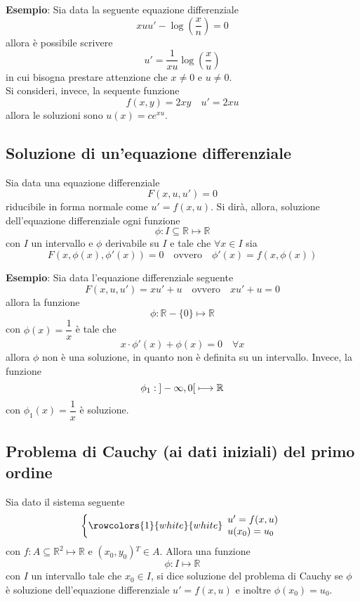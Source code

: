 \documentclass[a4paper]{extarticle}
\begin{document}
\vspace{2em}
\noindent
\textbf{Esempio}: Sia data la seguente equazione differenziale
\[xuu' - \log \left(\dfrac{x}{n}\right) = 0\]
allora è possibile scrivere
\[u' = \dfrac{1}{xu} \log\left(\frac{x}{u}\right)\]
in cui bisogna prestare attenzione che $x\neq 0$ e $u \neq 0$.\\
Si consideri, invece, la sequente funzione
\[f(x,y)=2xy \hspace{1em} u'=2xu\]
allora le soluzioni sono $u(x)=c e^{xu}$.

\vspace{1em}
\subsection{Soluzione di un'equazione differenziale}
Sia data una equazione differenziale
\[F(x,u,u')=0\]
riducibile in forma normale come $u'=f(x,u)$. Si dirà, allora, soluzione dell'equazione differenziale ogni funzione
\[\phi : I \subseteq \mathbb{R} \longmapsto \mathbb{R}\]
con $I$ un intervallo e $\phi$ derivabile su $I$ e tale che $\forall x \in I$ sia
\[F(x,\phi(x),\phi'(x)) = 0 \hspace{1em} \text{ovvero} \hspace{1em} \phi'(x)=f(x,\phi(x))\]

\vspace{2em}
\noindent
\textbf{Esempio}: Sia data l'equazione differenziale seguente
\[F(x,u,u')=xu' + u \hspace{1em} \text{ovvero} \hspace{1em}xu'+u=0\]
allora la funzione
\[\phi : \mathbb{R} - \{0\} \longmapsto \mathbb{R}\]
con $\phi(x)=\dfrac{1}{x}$ è tale che
\[x \cdot \phi'(x) + \phi(x) = 0 \hspace{1em} \forall x\]
allora $\phi$ non è una soluzione, in quanto non è definita su un intervallo. Invece, la funzione
\[\phi_1 : \hspace{0.25em} ]-\infty,0[\hspace{0.25em} \longmapsto \mathbb{R}\]
con $\phi_1(x)=\dfrac{1}{x}$ è soluzione.

\vspace{1em}
\subsection{Problema di Cauchy (ai dati iniziali) del primo ordine}
Sia dato il sistema seguente
\[
    \left\{
        \rowcolors{1}{white}{white}
        \begin{array}{l}
            u'=f(x,u)\\
            u(x_0)=u_0
        \end{array}
    \right.
\]
con $f : A \subseteq \mathbb{R}^2 \longmapsto \mathbb{R}$ e $(x_0,y_0){^T} \in A$. Allora una funzione
\[\phi : I \longmapsto \mathbb{R}\]
con $I$ un intervallo tale che $x_0 \in I$, si dice soluzione del problema di Cauchy se $\phi$ è soluzione dell'equazione differenziale $u'=f(x,u)$ e inoltre $\phi(x_0)=u_0$.
\end{document}
